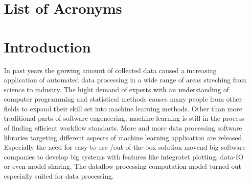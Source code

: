 \documentclass[english]{article}
\begin{document}
\section*{List of Acronyms}
\begin{acronym}
\end{acronym}

\section{Introduction}

In past years the growing amount of collected data caused a increasing application of automated data processing in a wide range of areas streching from  science to industry.
The hight demand of experts with an understanding of computer programming and statistical methods causes many people from other fields to expand their skill set into machine learning methods. Other than more traditional parts of software engeneering, machine learning is still in the process of finding efficient workflow standarts. More and more data processing software libraries targeting different aspects of machine learning application are released. Especially the need for easy-to-use /out-of-the-box solution movend big software companies to develop big systems with features like integratet plotting, data-IO or even model sharing. The dataflow processing computation model turned out especially suited for data processing.
\end{document}
